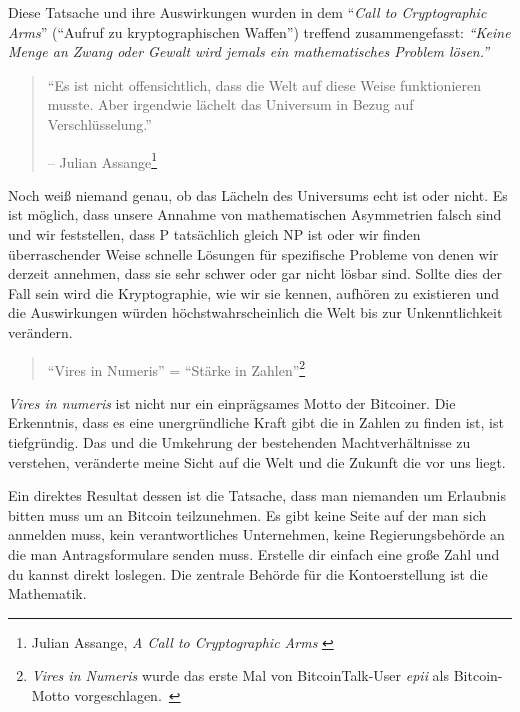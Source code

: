 Diese Tatsache und ihre Auswirkungen wurden in dem \enquote{\textit{Call to
Cryptographic Arms}} (\enquote{Aufruf zu kryptographischen Waffen}) treffend
zusammengefasst: \textit{\enquote{Keine Menge an Zwang oder Gewalt wird jemals
ein mathematisches Problem lösen.}}

\begin{quotation}\begin{samepage}
\enquote{Es ist nicht offensichtlich, dass die Welt auf diese Weise
funktionieren musste. Aber irgendwie lächelt das Universum in Bezug auf
Verschlüsselung.}
\begin{flushright} -- Julian Assange\footnote{Julian Assange, \textit{A Call to Cryptographic Arms} \cite{call-to-cryptographic-arms}}
\end{flushright}\end{samepage}\end{quotation}

Noch weiß niemand genau, ob das Lächeln des Universums echt ist oder nicht. Es
ist möglich, dass unsere Annahme von mathematischen Asymmetrien falsch sind und
wir feststellen, dass P tatsächlich gleich NP \cite{wiki:pnp} ist oder wir
finden überraschender Weise schnelle Lösungen für spezifische Probleme
\cite{wiki:discrete-log} von denen wir derzeit annehmen, dass sie sehr schwer
oder gar nicht lösbar sind. Sollte dies der Fall sein wird die Kryptographie,
wie wir sie kennen, aufhören zu existieren und die Auswirkungen würden
höchstwahrscheinlich die Welt bis zur Unkenntlichkeit verändern.

\begin{quotation}\begin{samepage}
\enquote{Vires in Numeris} = \enquote{Stärke in Zahlen}\footnote{\textit{Vires
in Numeris} wurde das erste Mal von BitcoinTalk-User \textit{epii} als
Bitcoin-Motto vorgeschlagen.~\cite{epii}}
\end{samepage}\end{quotation}

\textit{Vires in numeris} ist nicht nur ein einprägsames Motto der Bitcoiner.
Die Erkenntnis, dass es eine unergründliche Kraft gibt die in Zahlen zu finden
ist, ist tiefgründig. Das und die Umkehrung der bestehenden Machtverhältnisse zu
verstehen, veränderte meine Sicht auf die Welt und die Zukunft die vor uns
liegt.

Ein direktes Resultat dessen ist die Tatsache, dass man niemanden um Erlaubnis
bitten muss um an Bitcoin teilzunehmen. Es gibt keine Seite auf der man sich
anmelden muss, kein verantwortliches Unternehmen, keine Regierungsbehörde an die
man Antragsformulare senden muss. Erstelle dir einfach eine große Zahl und du
kannst direkt loslegen. Die zentrale Behörde für die Kontoerstellung ist die
Mathematik.

